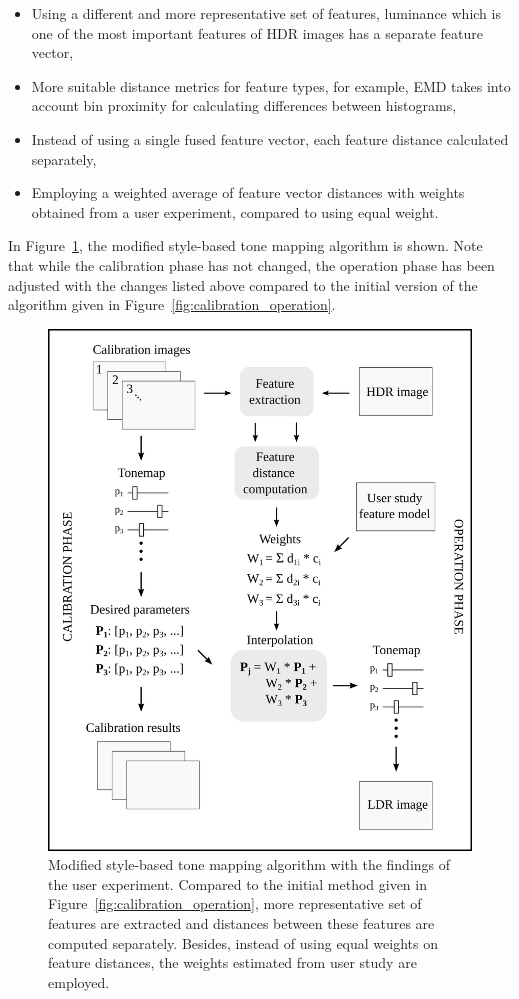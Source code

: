 \begin{itemize}
    \item Using a different and more representative set of features, luminance which is one of the most important features of HDR images has a separate feature vector,
    \item More suitable distance metrics for feature types, for example, EMD takes into account bin proximity for calculating differences between histograms,
    \item Instead of using a single fused feature vector, each feature distance calculated separately,
    \item Employing a weighted average of feature vector distances with weights obtained from a user experiment, compared to using equal weight.
\end{itemize}

In Figure~\ref{fig:algo_updated}, the modified style-based tone mapping algorithm is shown. Note that while the calibration phase has not changed, the operation phase has been adjusted with the changes listed above compared to the initial version of the algorithm given in Figure~\ref{fig:calibration_operation}. 

\begin{figure}
    \centering
    \includegraphics[width=\textwidth]{figures/algorithm_updated.png}
    \caption{Modified style-based tone mapping algorithm with the findings of the user experiment. Compared to the initial method given in Figure~\ref{fig:calibration_operation}, more representative set of features are extracted and distances between these features are computed separately. Besides, instead of using equal weights on feature distances, the weights estimated from user study are employed.}
    \label{fig:algo_updated}
\end{figure}

